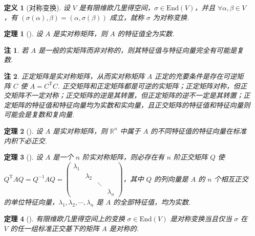 \documentclass[zihao=-4,UTF8,linespread=1.8,nothm]{aytony_base}
\newtheorem{theorem}{\indent 定理}[subsection]
\newtheorem{definition}{\indent 定义}[subsection]
\newtheorem*{remark}{\indent 注}
\begin{document}
\begin{definition}[对称变换]
    设 $V$ 是有限维欧几里得空间，$\sigma \in \mathrm{End}(V)$，并且 $\forall \alpha, \beta \in V$，有 $(\sigma(\alpha), \beta) = (\alpha, \sigma(\beta))$ 成立，就称 $\sigma$ 为对称变换.
\end{definition}

\begin{theorem}[]
    设 $A$ 是实对称矩阵，则 $A$ 的特征值全为实数.
\end{theorem}

\begin{remark}
    若 $A$ 是一般的实矩阵而非对称的，则其特征值与特征向量完全有可能是复数.
\end{remark}

\begin{remark}
    正定矩阵是实对称矩阵，从而实对称矩阵 $A$ 正定的充要条件是存在可逆矩阵 $C$ 使 $A = C ^{\mathrm{T}}C$. 正交矩阵和正定矩阵都是可逆的实矩阵；正定矩阵对称，但正交矩阵不一定对称；正交矩阵的逆是其转置，但正定矩阵的逆不一定是其转置；正定矩阵的特征值和特征向量均为实数和实向量，且正交矩阵的特征值和特征向量则可能会是复数和复向量.
\end{remark}

\begin{theorem}[]
    设 $A$ 是实对称矩阵，则 $\mathbb{R}^n$ 中属于 $A$ 的不同特征值的特征向量在标准内积下必正交.
\end{theorem}

\begin{theorem}[]
    设 $A$ 是一个 $n$ 阶实对称矩阵，则必存在有 $n$ 阶正交矩阵 $Q$ 使 $Q ^{\mathrm{T}} AQ = Q ^{-1}AQ = \left(
        \begin{matrix}
                \lambda_1 &           &        &           \\
                          & \lambda_2 &        &           \\
                          &           & \ddots &           \\
                          &           &        & \lambda_n
            \end{matrix}
        \right)$，其中 $Q$ 的列向量是 $A$ 的 $n$ 个相互正交的单位特征向量，${\lambda}_1, {\lambda}_2, \cdots, {\lambda}_{n}$ 是 $A$ 的全部特征值，均为实数.
\end{theorem}

\begin{theorem}[]
    有限维欧几里得空间上的变换 $\sigma \in \mathrm{End}(V)$ 是对称变换当且仅当 $\sigma$ 在 $V$ 的任一组标准正交基下的矩阵 $A$ 是对称的.
\end{theorem}
\end{document}
